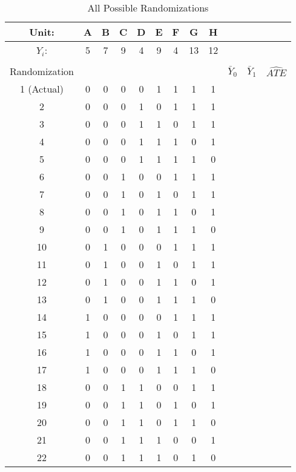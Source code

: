 \documentclass[a4paper,12pt]{article}
\begin{document}
\clearpage

\begin{center}
\small
\begin{longtable}{c|cccccccc|rrr}
\caption{All Possible Randomizations}\label{tab:randomization} \\ \toprule
Unit: & A & B & C & D & E & F & G & H & && \\ \midrule
$Y_i$: & 5 & 7 & 9 & 4 & 9 & 4 & 13 & 12 &  &  \\
  &&&&&&&&&&& \\
Randomization & &&&&&&&& $\bar{Y}_0$ & $\bar{Y}_1$ & $\widehat{ATE}$ \\ \midrule
1 (Actual) & 0 & 0 & 0 & 0 & 1 & 1 & 1 & 1 & \hspace{5em} & \hspace{5em} & \hspace{5em} \\
2 & 0 & 0 & 0 & 1 & 0 & 1 & 1 & 1 & \\
3 & 0 & 0 & 0 & 1 & 1 & 0 & 1 & 1 & \\
4 & 0 & 0 & 0 & 1 & 1 & 1 & 0 & 1 & \\
5 & 0 & 0 & 0 & 1 & 1 & 1 & 1 & 0 & \\ \midrule
6 & 0 & 0 & 1 & 0 & 0 & 1 & 1 & 1 & \\
7 & 0 & 0 & 1 & 0 & 1 & 0 & 1 & 1 & \\
8 & 0 & 0 & 1 & 0 & 1 & 1 & 0 & 1 & \\
9 & 0 & 0 & 1 & 0 & 1 & 1 & 1 & 0 & \\
10 & 0 & 1 & 0 & 0 & 0 & 1 & 1 & 1 & \\ \midrule
11 & 0 & 1 & 0 & 0 & 1 & 0 & 1 & 1 & \\
12 & 0 & 1 & 0 & 0 & 1 & 1 & 0 & 1 & \\
13 & 0 & 1 & 0 & 0 & 1 & 1 & 1 & 0 & \\
14 & 1 & 0 & 0 & 0 & 0 & 1 & 1 & 1 & \\
15 & 1 & 0 & 0 & 0 & 1 & 0 & 1 & 1 & \\ \midrule
16 & 1 & 0 & 0 & 0 & 1 & 1 & 0 & 1 & \\
17 & 1 & 0 & 0 & 0 & 1 & 1 & 1 & 0 & \\
18 & 0 & 0 & 1 & 1 & 0 & 0 & 1 & 1 & \\
19 & 0 & 0 & 1 & 1 & 0 & 1 & 0 & 1 & \\
20 & 0 & 0 & 1 & 1 & 0 & 1 & 1 & 0 & \\ \midrule
21 & 0 & 0 & 1 & 1 & 1 & 0 & 0 & 1 & \\
22 & 0 & 0 & 1 & 1 & 1 & 0 & 1 & 0 & \\

\end{longtable}
\end{center}
\end{document}

